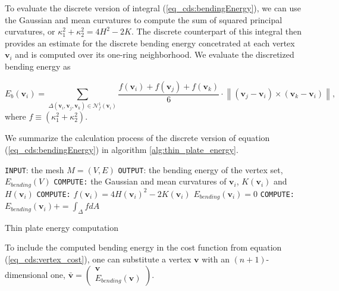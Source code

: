 \documentclass[graybox]{svmult}
\begin{document}
To evaluate the discrete version of integral (\ref{eq_cds:bendingEnergy}), we can use the Gaussian and mean curvatures to compute the sum of squared principal curvatures, or $\kappa_1^2 + \kappa_2^2 = 4H^2 - 2K  $. The discrete counterpart of this integral then provides an estimate for the discrete bending energy concetrated at each vertex $\mathbf{v}_i$ and is computed over its one-ring neighborhood. We evaluate the discretized bending energy as 

\begin{equation}
\label{eq_cds:bendingEnergyDiscrete}
E_{b}(\mathbf{{v}}_i) = \sum_{\Delta({\mathbf{{v}}_i,\mathbf{{v}}_j,\mathbf{{v}}_k}) \in \mathcal{N}_f^1(\mathbf{{v}}_i)} 
\frac{f(\mathbf{{v}}_i) + f(\mathbf{{v}}_j) + f(\mathbf{{v}}_k)}{6} \cdot \left\lVert (\mathbf{{v}}_j - \mathbf{{v}}_i) \times (\mathbf{{v}}_k - \mathbf{{v}}_i) \right\rVert,
\end{equation}
where $f \equiv (\kappa_1^2 + \kappa_2^2)$.


We summarize the calculation process of the discrete version of equation (\ref{eq_cds:bendingEnergy}) in algorithm \ref{alg:thin_plate_energy}.

\begin{algorithm}
	\begin{algorithmic}
		\STATE \texttt{INPUT}: the mesh $M=(V,E)$
		\STATE \texttt{OUTPUT}: the bending energy of the vertex set, $E_{bending}(V)$
		\STATE \texttt{COMPUTE:} the Gaussian and mean curvatures of $\mathbf{v}_i$,
		$K(\mathbf{{v}}_i)$ and $H(\mathbf{{v}}_i)$
		\STATE \texttt{COMPUTE:} $f(\mathbf{v}_i) = 4H(\mathbf{{v}}_i)^2 - 2K(\mathbf{{v}}_i)$ 
		\ENDFOR
		\STATE $E_{bending}(\mathbf{{v}}_i) = 0$
		\STATE \texttt{COMPUTE:} $E_{bending}(\mathbf{v}_i) += \int_{\Delta }{f}dA$
		\ENDFOR
		\ENDFOR
	\end{algorithmic}
	\caption{Thin plate energy computation}
	\label{alg:thin_plate_energy}
\end{algorithm}
To include the computed bending energy in the cost function from equation (\ref{eq_cds:vertex_cost}), one can substitute a vertex $\mathbf{v}$ with an $(n+1)$-dimensional one, $\mathbf{\bar{v}}=\begin{pmatrix}\mathbf{v} \\ E_{bending}(\mathbf{v})\end{pmatrix}$.
\end{document}
